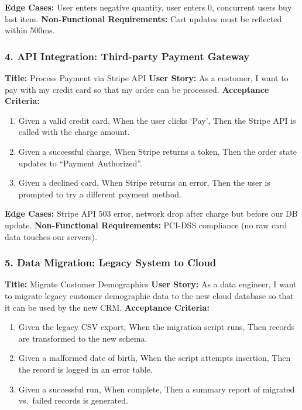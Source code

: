 \documentclass[
  11pt,
  openany,
  oneside]{book}
\providecommand{\tightlist}{%
  \setlength{\itemsep}{0pt}\setlength{\parskip}{0pt}}
\begin{document}
\textbf{Edge Cases:} User enters negative quantity, user enters 0,
concurrent users buy last item. \textbf{Non-Functional Requirements:}
Cart updates must be reflected within 500ms.

\subsubsection{4. API Integration: Third-party Payment
Gateway}\label{api-integration-third-party-payment-gateway}

\textbf{Title:} Process Payment via Stripe API \textbf{User Story:} As a
customer, I want to pay with my credit card so that my order can be
processed. \textbf{Acceptance Criteria:}

\begin{enumerate}
\def\labelenumi{\arabic{enumi}.}
\tightlist
\item
  Given a valid credit card, When the user clicks `Pay', Then the Stripe
  API is called with the charge amount.
\item
  Given a successful charge, When Stripe returns a token, Then the order
  state updates to ``Payment Authorized''.
\item
  Given a declined card, When Stripe returns an error, Then the user is
  prompted to try a different payment method.
\end{enumerate}

\textbf{Edge Cases:} Stripe API 503 error, network drop after charge but
before our DB update. \textbf{Non-Functional Requirements:} PCI-DSS
compliance (no raw card data touches our servers).

\subsubsection{5. Data Migration: Legacy System to
Cloud}\label{data-migration-legacy-system-to-cloud}

\textbf{Title:} Migrate Customer Demographics \textbf{User Story:} As a
data engineer, I want to migrate legacy customer demographic data to the
new cloud database so that it can be used by the new CRM.
\textbf{Acceptance Criteria:}

\begin{enumerate}
\def\labelenumi{\arabic{enumi}.}
\tightlist
\item
  Given the legacy CSV export, When the migration script runs, Then
  records are transformed to the new schema.
\item
  Given a malformed date of birth, When the script attempts insertion,
  Then the record is logged in an error table.
\item
  Given a successful run, When complete, Then a summary report of
  migrated vs.~failed records is generated.
\end{enumerate}
\end{document}
